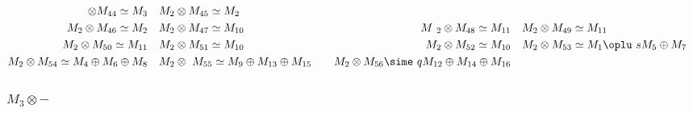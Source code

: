 \begin{align*}
{2} \otimes M_{44} \simeq M_{3} &&& M_{2} \otimes M_{45} \simeq M_{2}\\
M_{2} \otimes M_{46} \simeq M_{2} &&& M_{2} \otimes M_{47} \simeq M_{10} &&& M\
_{2} \otimes M_{48} \simeq M_{11} &&& M_{2} \otimes M_{49} \simeq M_{11}\\
M_{2} \otimes M_{50} \simeq M_{11} &&& M_{2} \otimes M_{51} \simeq M_{10} &&& \
M_{2} \otimes M_{52} \simeq M_{10} &&& M_{2} \otimes M_{53} \simeq M_{1} \oplu\
s M_{5} \oplus M_{7}\\
M_{2} \otimes M_{54} \simeq M_{4} \oplus M_{6} \oplus M_{8} &&& M_{2} \otimes \
M_{55} \simeq M_{9} \oplus M_{13} \oplus M_{15} &&& M_{2} \otimes M_{56} \sime\
q M_{12} \oplus M_{14} \oplus M_{16}\\
\end{align*}

\subsubsection{$M_3\otimes -$}
